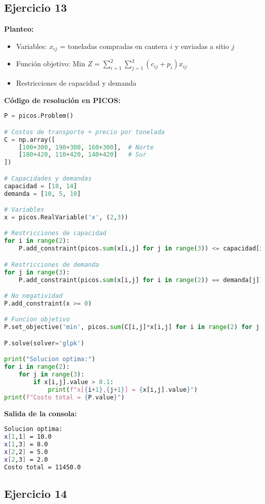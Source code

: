 \documentclass[12pt]{article}
\begin{document}
\subsection{Ejercicio 13}

\textbf{Planteo:}
\begin{itemize}
\item Variables: $x_{ij}$ = toneladas compradas en cantera $i$ y enviadas a sitio $j$
\item Función objetivo: Min $Z = \sum_{i=1}^2 \sum_{j=1}^3 (c_{ij} + p_i)x_{ij}$
\item Restricciones de capacidad y demanda
\end{itemize}

\textbf{Código de resolución en PICOS:}
\begin{lstlisting}[language=Python]
P = picos.Problem()

# Costos de transporte + precio por tonelada
C = np.array([
    [100+300, 190+300, 160+300],  # Norte
    [180+420, 110+420, 140+420]   # Sur
])

# Capacidades y demandas
capacidad = [18, 14]
demanda = [10, 5, 10]

# Variables
x = picos.RealVariable('x', (2,3))

# Restricciones de capacidad
for i in range(2):
    P.add_constraint(picos.sum(x[i,j] for j in range(3)) <= capacidad[i])

# Restricciones de demanda
for j in range(3):
    P.add_constraint(picos.sum(x[i,j] for i in range(2)) == demanda[j])

# No negatividad
P.add_constraint(x >= 0)

# Funcion objetivo
P.set_objective('min', picos.sum(C[i,j]*x[i,j] for i in range(2) for j in range(3)))

P.solve(solver='glpk')

print("Solucion optima:")
for i in range(2):
    for j in range(3):
        if x[i,j].value > 0.1:
            print(f"x[{i+1},{j+1}] = {x[i,j].value}")
print(f"Costo total = {P.value}")
\end{lstlisting}

\textbf{Salida de la consola:}
\begin{lstlisting}[language=bash,backgroundcolor=\color{black},basicstyle=\color{white}\ttfamily,numbers=none]
Solucion optima:
x[1,1] = 10.0
x[1,3] = 8.0
x[2,2] = 5.0
x[2,3] = 2.0
Costo total = 11450.0
\end{lstlisting}

\subsection{Ejercicio 14}
\end{document}

